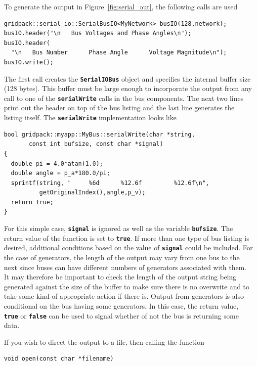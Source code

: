 To generate the output in Figure~\ref{fig:serial_out}, the following calls are used

{
\color{red}
\begin{Verbatim}[fontseries=b]
gridpack::serial_io::SerialBusIO<MyNetwork> busIO(128,network);
busIO.header("\n   Bus Voltages and Phase Angles\n");
busIO.header(
  "\n   Bus Number      Phase Angle      Voltage Magnitude\n");
busIO.write();
\end{Verbatim}
}

The first call creates the \texttt{\textbf{SerialIOBus}} object and specifies the internal buffer size (128 bytes). This buffer must be large enough to incorporate the output from any call to one of the \texttt{\textbf{serialWrite}} calls in the bus components. The next two lines print out the header on top of the bus listing and the last line generates the listing itself. The \texttt{\textbf{serialWrite}} implementation looks like

{
\color{red}
\begin{Verbatim}[fontseries=b]
bool gridpack::myapp::MyBus::serialWrite(char *string,
       const int bufsize, const char *signal)
{  
  double pi = 4.0*atan(1.0);
  double angle = p_a*180.0/pi;
  sprintf(string, "     %6d      %12.6f         %12.6f\n",
          getOriginalIndex(),angle,p_v);
  return true;
}
\end{Verbatim}
}

For this simple case, \texttt{\textbf{signal}} is ignored as well as the variable
\texttt{\textbf{bufsize}}. The return value of the function is set to
\texttt{\textbf{true}}. If more than one type of bus listing is desired,
additional conditions based on the value of \texttt{\textbf{signal}} could be
included. For the case of generators, the length of the output may vary from one
bus to the next since buses can have different numbers of generators associated
with them. It may therefore be important to check the length of the output
string being generated against the size of the buffer to make sure there is no
overwrite and to take some kind of appropriate action if there is. Output from
generators is also conditional on the bus having some generators. In this case,
the return value, \texttt{\textbf{true}} or \texttt{\textbf{false}} can be used
to signal whether of not the bus is returning some data.

If you wish to direct the output to a file, then calling the function

{
\color{red}
\begin{Verbatim}[fontseries=b]
void open(const char *filename)
\end{Verbatim}
}


